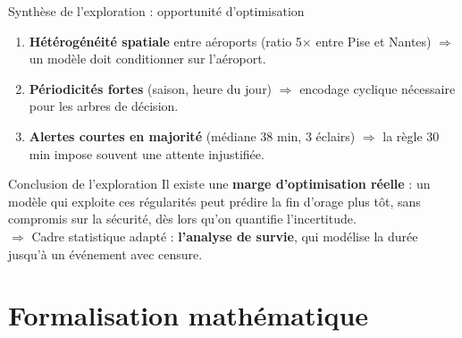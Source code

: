 \documentclass[aspectratio=169,t,11pt]{beamer}
\begin{document}
\begin{frame}{Synthèse de l'exploration : opportunité d'optimisation}
\vspace{-2pt}
\begin{tcolorbox}[mybox,colback=metBlue!5,colframe=metBlue,
  title={Trois constats forts ressortent des données}]
\small
\begin{enumerate}\setlength\itemsep{2pt}
  \item \textbf{Hétérogénéité spatiale} entre aéroports (ratio 5$\times$ entre Pise et Nantes)
        $\Rightarrow$ un modèle doit conditionner sur l'aéroport.
  \item \textbf{Périodicités fortes} (saison, heure du jour) $\Rightarrow$
        encodage cyclique nécessaire pour les arbres de décision.
  \item \textbf{Alertes courtes en majorité} (médiane 38 min, 3 éclairs)
        $\Rightarrow$ la règle 30 min impose souvent une attente injustifiée.
\end{enumerate}
\end{tcolorbox}
\vspace{4pt}
\begin{exampleblock}{Conclusion de l'exploration}
\small
Il existe une \textbf{marge d'optimisation réelle} : un modèle qui exploite
ces régularités peut prédire la fin d'orage plus tôt, sans compromis sur la sécurité,
dès lors qu'on quantifie l'incertitude.\\[4pt]
$\Rightarrow$ Cadre statistique adapté : \textbf{l'analyse de survie}, qui modélise
la durée jusqu'à un événement avec censure.
\end{exampleblock}
\end{frame}

\section{Formalisation mathématique}
\end{document}
